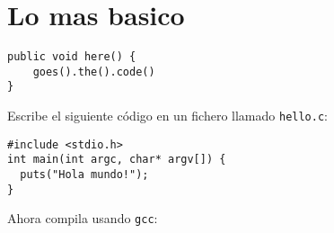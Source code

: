\section{Lo mas basico}

\begin{lstlisting}[caption=Some Code]
public void here() {
    goes().the().code()
}
\end{lstlisting}

Escribe el siguiente código en un fichero llamado \texttt{hello.c}:
 
\begin{lstlisting}[style=C,label=some-code,caption=Some Code]
#include <stdio.h>
int main(int argc, char* argv[]) {
  puts("Hola mundo!");
}
\end{lstlisting}
 
\noindent
Ahora compila usando \texttt{gcc}:
 
